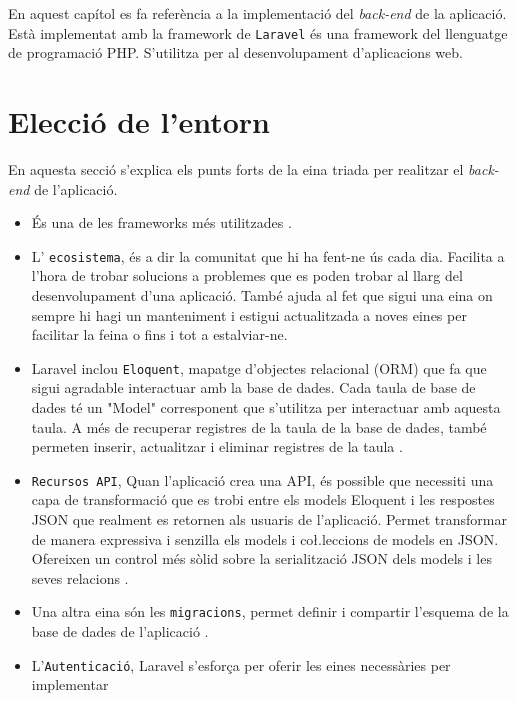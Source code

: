 \label{chap:back-end}

En aquest capítol es fa referència a la implementació del \emph{back-end} de la aplicació.
Està implementat amb la framework de \texttt{Laravel} \autocite{laravel}
és una framework del llenguatge de programació PHP. S'utilitza per al desenvolupament d'aplicacions web.

\section{Elecció de l'entorn}

En aquesta secció s'explica els punts forts de la eina triada per realitzar el \emph{back-end} de l'aplicació.

\begin{itemize}
    \item És una de les frameworks més utilitzades \autocite{estadistiques_backend}.
    \item L' \texttt{ecosistema}, és a dir la comunitat que hi ha fent-ne ús cada dia.
    Facilita a l'hora de trobar solucions a problemes que es poden trobar al llarg del
    desenvolupament d'una aplicació. També ajuda al fet que sigui una eina on sempre hi
    hagi un manteniment i estigui actualitzada a noves eines per facilitar la feina o fins
    i tot a estalviar-ne.
    \item Laravel inclou \texttt{Eloquent}, mapatge d'objectes relacional (ORM) que fa que sigui
    agradable interactuar amb la base de dades. Cada taula de base de dades té un "Model"
    corresponent que s'utilitza per interactuar amb aquesta taula. A més de recuperar registres
    de la taula de la base de dades, també permeten inserir, actualitzar i eliminar registres
    de la taula \autocite{eloquent_laravel}.
    \item \texttt{Recursos API}, Quan l'aplicació crea una API, és possible que necessiti una capa
    de transformació que es trobi entre els models Eloquent i les respostes JSON que realment
    es retornen als usuaris de l'aplicació. Permet transformar de manera expressiva i senzilla
    els models i co\l.leccions de models en JSON.
    Ofereixen un control més sòlid sobre la serialització JSON dels models i les seves relacions
    \autocite{resources_laravel}.
    \item Una altra eina són les \texttt{migracions}, permet definir i compartir l'esquema de la
    base de dades de l'aplicació \autocite{migrations_laravel}.
    \item L'\texttt{Autenticació}, Laravel s'esforça per oferir les eines necessàries per implementar

\end{itemize}
